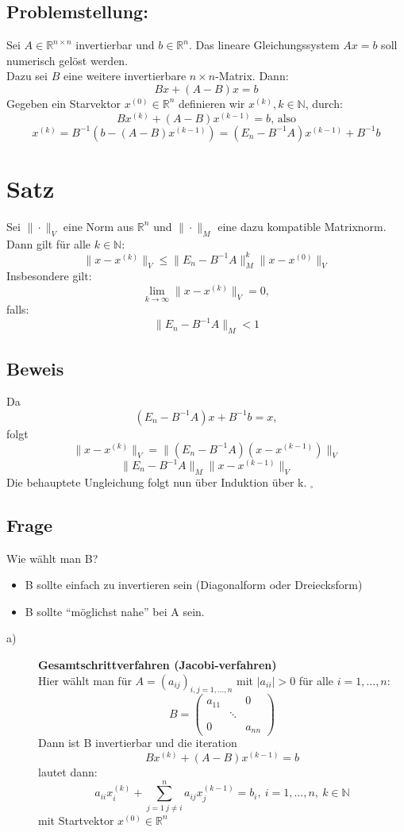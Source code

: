 \documentclass{scrbook}
\begin{document}
\subsection*{Problemstellung:} Sei $A \in \mathbb{R}^{n\times n}$ invertierbar und $b \in \mathbb{R}^n$. Das lineare Gleichungssystem $Ax=b$ soll numerisch gelöst werden.\\
Dazu sei $B$ eine weitere invertierbare $n \times n$-Matrix. Dann:
\[
Bx+(A-B)x =b
\]
Gegeben ein Starvektor $x^{(0)} \in \mathbb{R}^n$ definieren wir $x^(k), k\in \mathbb{N}$, durch:
\[
Bx^{(k)} +(A-B)x^{(k-1)}=b \text{, also}
\]
\[
x^{(k)} = B^{-1}(b-(A-B)x^{(k-1)})=(E_n-B^{-1}A)x^{(k-1)}+B^{-1}b
\]
\section{Satz}
Sei $\|\cdot\|_V$ eine Norm aus $\mathbb{R}^n$ und $\|\cdot\|_M$ eine dazu kompatible Matrixnorm. Dann gilt für alle $k \in \mathbb{N}$:
\[
\|x-x^{(k)}\|_V \leq \|E_n-B^{-1}A\|^k_M\|x-x^{(0)}\|_V
\]
Insbesondere gilt:
\[
\lim_{k\to \infty} \|x-x^{(k)}\|_V = 0,
\]
falls:
\[
\|E_n-B^{-1}A\|_M<1
\]
\subsection*{Beweis}
Da
\[(E_n-B^{-1}A)x+B^{-1}b=x,\]
folgt
\[
\|x-x^{(k)}\|_V = \|(E_n-B^{-1}A)(x-x^{(k-1)})\|_V\]
\[\|E_n-B^{-1}A\|_M\|x-x^{(k-1)}\|_V\]
Die behauptete Ungleichung folgt nun über Induktion über k. $_\square$
\subsection*{Frage}
Wie wählt man B?
\begin{itemize}
\item B sollte einfach zu invertieren sein (Diagonalform oder Dreiecksform)
\item B sollte "`möglichst nahe"' bei A sein.
\end{itemize}
\begin{description}
\item[a)] \textbf{Gesamtschrittverfahren (Jacobi-verfahren)}\\
Hier wählt man für $A = (a_{ij})_{i,j = 1,...,n}$ mit $|a_{ii}| > 0$ für alle $i=1,...,n$:
\[B=
\left(
\begin{array}{ccc}
a_{11}&&0\\
&\ddots\\
0&&a_{nn}
\end{array}
\right)
\]
Dann ist B invertierbar und die iteration
\[Bx^{(k)}+(A-B)x^{(k-1)} = b\]
lautet dann:
\[
a_{ii} x^{(k)}_i + \sum^n_{j=1\ j \neq i}a_{ij} x_j^{(k-1)}=b_i, \ i=1,...,n,\ k \in \mathbb{N}
\]
mit Startvektor $x^{(0)} \in \mathbb{R}^n$
\end{description}
\end{document}
